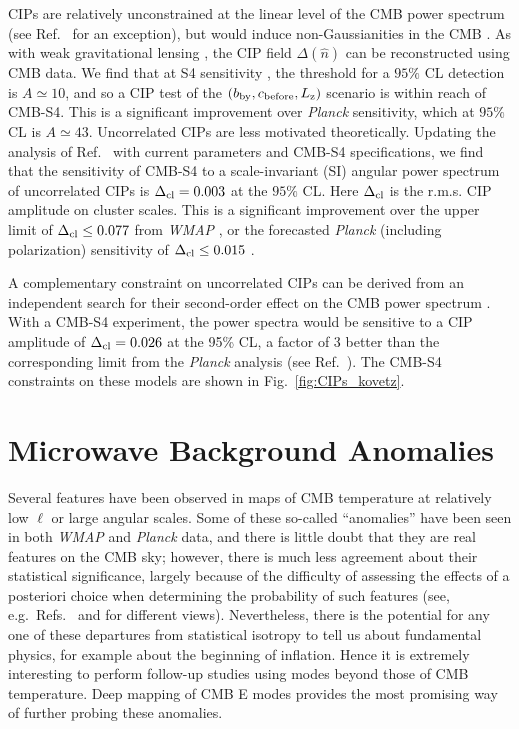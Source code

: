 CIPs are relatively unconstrained at the linear level of the CMB power spectrum (see Ref.~\cite{Munoz:2015fdv} for an exception), but would induce non-Gaussianities in the CMB \cite{Grin:2011nk,Grin:2011tf,Grin:2013uya,He:2015msa}. As with weak gravitational lensing \cite{Hu:2001kj}, the CIP field $\Delta(\hat{n})$ can be reconstructed using CMB data. We find that at S4 sensitivity \cite{He:2015msa}, the threshold for a $95\%$ CL detection is $A\simeq 10$, and so a CIP test of the $(b_{\rm by}, c_{\rm before}, L_{\rm z})$ scenario is within reach of CMB-S4. This is a significant improvement over \emph{Planck} sensitivity, which at $95\%$ CL is $A\simeq 43$. Uncorrelated CIPs are less  motivated theoretically. Updating the analysis of Ref.~\cite{He:2015msa} with current parameters \cite{Ade:2015lrj} and CMB-S4 specifications, we find that the sensitivity of CMB-S4 to a scale-invariant (SI) angular power spectrum of uncorrelated CIPs is $\Delta_{\rm cl}=0.003$ at the $95\%$ CL. Here $\Delta_{\rm cl}$ is the r.m.s. CIP amplitude on cluster scales. This is a significant improvement over the upper limit of $\Delta_{\rm cl}\leq 0.077$ from {\it WMAP\/} \cite{Grin:2013uya}, or the forecasted {\it Planck\/} \cite{Ade:2015lrj} (including polarization) sensitivity of $\Delta_{\rm cl}\leq 0.015$ \cite{He:2015msa}. 

A complementary constraint on uncorrelated CIPs can be derived from an independent search for their second-order effect on the CMB power spectrum \cite{Munoz:2015fdv}. With a CMB-S4 experiment, the power spectra would be sensitive to a CIP amplitude of $\Delta_{\rm cl} = 0.026$ at the 95\% CL, a factor of 3 better than the corresponding limit from the {\it Planck\/} analysis (see Ref.~\cite{Munoz:2015fdv}). The CMB-S4 constraints on these models are shown in Fig.~\ref{fig:CIPs_kovetz}.


\section{Microwave Background Anomalies}

Several features have been observed in maps of CMB temperature at
relatively low $\ell$ or large angular scales.  Some of these
so-called ``anomalies'' have been seen in both {\it WMAP\/} and {\it Planck\/}
data, and there is little doubt that they are real features on the CMB sky;
however, there is much less agreement about their statistical significance,
largely because of the difficulty of assessing the effects of a posteriori
choice when determining the probability of such features
(see, e.g.\ Refs.~\cite{Bennett:2010jb,Ade:2015hxq} and \cite{Schwarz:2015cma} for
different views).  Nevertheless, there is
the potential for any one of these departures from statistical isotropy to
tell us about fundamental physics, for example about the beginning of inflation.
Hence it is extremely interesting to perform follow-up studies using modes
beyond those of CMB temperature.  Deep mapping of CMB E modes provides the most
promising way of further probing these anomalies.

